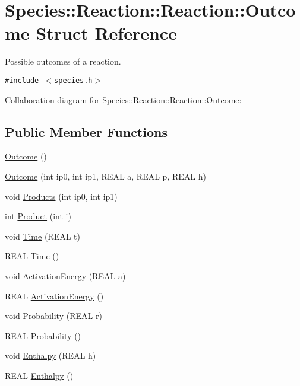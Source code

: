 \hypertarget{structSpecies_1_1Reaction_1_1Outcome}{
\section{Species::Reaction::Reaction::Outcome Struct Reference}
\label{structSpecies_1_1Reaction_1_1Outcome}
}
Possible outcomes of a reaction.  


{\tt \#include $<$species.h$>$}

Collaboration diagram for Species::Reaction::Reaction::Outcome:\subsection*{Public Member Functions}
\begin{CompactItemize}
\item 
\hyperlink{structSpecies_1_1Reaction_1_1Outcome_f0372a4ff441442b95fb549c2822e443}{Outcome} ()
\item 
\hyperlink{structSpecies_1_1Reaction_1_1Outcome_86196a9fb4193115c2c6517c3b52c8e7}{Outcome} (int ip0, int ip1, REAL a, REAL p, REAL h)
\item 
void \hyperlink{structSpecies_1_1Reaction_1_1Outcome_25af855f57626fde3dc99c9f723bf3c4}{Products} (int ip0, int ip1)
\item 
int \hyperlink{structSpecies_1_1Reaction_1_1Outcome_27ca27f30fd0a0f36c0ca2b41be69eb1}{Product} (int i)
\item 
void \hyperlink{structSpecies_1_1Reaction_1_1Outcome_b0bec41a7b80a0bdc969212ded2bd903}{Time} (REAL t)
\item 
REAL \hyperlink{structSpecies_1_1Reaction_1_1Outcome_9a666d72a707308722a7271b9dbbda13}{Time} ()
\item 
void \hyperlink{structSpecies_1_1Reaction_1_1Outcome_5af56168a504050654b3be2573176ea8}{ActivationEnergy} (REAL a)
\item 
REAL \hyperlink{structSpecies_1_1Reaction_1_1Outcome_7643a1714101a15a49b52137a414bcb3}{ActivationEnergy} ()
\item 
void \hyperlink{structSpecies_1_1Reaction_1_1Outcome_c1287cbdc6b08733b48cbb57d5d3fc72}{Probability} (REAL r)
\item 
REAL \hyperlink{structSpecies_1_1Reaction_1_1Outcome_765753f408399d91d8cc94566042db1b}{Probability} ()
\item 
void \hyperlink{structSpecies_1_1Reaction_1_1Outcome_55e9f04c416460fadb84788ba9e5108c}{Enthalpy} (REAL h)
\item 
REAL \hyperlink{structSpecies_1_1Reaction_1_1Outcome_499c792cd3b6b76ff268184c46c3a4d6}{Enthalpy} ()
\end{CompactItemize}
